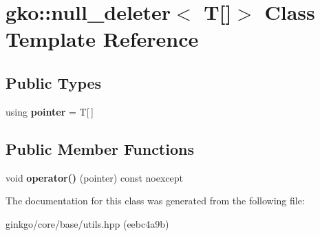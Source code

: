 \hypertarget{classgko_1_1null__deleter_3_01T[]_4}{}\section{gko\+:\+:null\+\_\+deleter$<$ T\mbox{[}\mbox{]}$>$ Class Template Reference}
\label{classgko_1_1null__deleter_3_01T[]_4}
\subsection*{Public Types}
\begin{DoxyCompactItemize}
\item 
\mbox{\label{classgko_1_1null__deleter_3_01T[]_4_a327915073992d00be1ff71150c2792b3}} 
using {\bfseries pointer} = T\mbox{[}$\,$\mbox{]}
\end{DoxyCompactItemize}
\subsection*{Public Member Functions}
\begin{DoxyCompactItemize}
\item 
\mbox{\label{classgko_1_1null__deleter_3_01T[]_4_abce6b34c72d1cb5984b1809787f73012}} 
void {\bfseries operator()} (pointer) const noexcept
\end{DoxyCompactItemize}


The documentation for this class was generated from the following file\+:\begin{DoxyCompactItemize}
\item 
ginkgo/core/base/utils.\+hpp (eebc4a9b)\end{DoxyCompactItemize}
